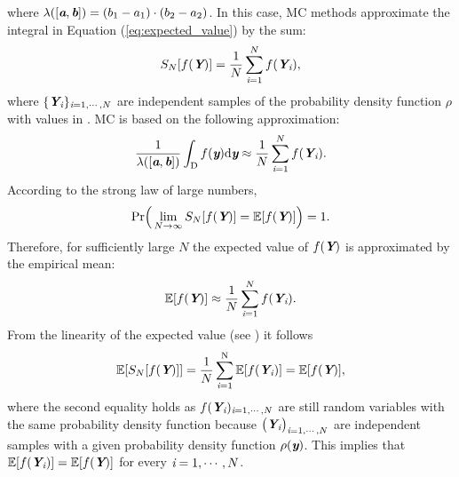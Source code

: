where $\lambda([\textit{\textbf{a}},\textit{\textbf{b}}]) = (b_1-a_1)\cdot(b_2-a_2)$.
In this case, MC methods approximate the integral in Equation (\ref{eq:expected_value}) by the sum:
\begin{equation}
S_{N}[f(\textit{\textbf{Y}})] = \frac{1}{N} \sum_{\textit{i}=1}^{N} f(\textit{\textbf{Y}}_{\textit{i}}),
\end{equation}
where $\{\textit{\textbf{Y}}_{\textit{i}}\}_{\textit{i} = 1, \cdots, N}$ are independent samples of the probability density function $\rho$ with values in  \cite{owen2003quasi}. MC is based on the following approximation:
\begin{equation}\label{eq:approx_MC_QMC}
\frac{1}{\lambda([\textit{\textbf{a}},\textit{\textbf{b}}])}\int_{\textup{D}}f(\textit{\textbf{y}}) \textrm{d}\textit{\textbf{y}}\approx\frac{1}{N} \sum_{\textit{i}=1}^{N} f(\textit{\textbf{Y}}_{\textit{i}}).
\end{equation}
According to the strong law of large numbers,
\begin{equation}
\textrm{Pr}\Big(\lim_{N\rightarrow\infty}S_{N}[f(\textit{\textbf{Y}})] = \mathbb{E}[f(\textit{\textbf{Y}})] \Big) = 1.
\end{equation}
Therefore, for sufficiently large $N$ the expected value of $f(\textit{\textbf{Y}})$ is approximated by the empirical mean:
\begin{equation}
\mathbb{E}[f(\textit{\textbf{Y}})] \approx \frac{1}{N} \sum_{\textit{i}=1}^{N} f(\textit{\textbf{Y}}_{\textit{i}}).
\end{equation}
From the linearity of the expected value (see \cite{grinstead2012introduction})
 it follows
\begin{equation}\label{eq:linearity}
\mathbb{E}[S_{N}[f(\textit{\textbf{Y}})]] = \frac{1}{N}\sum_{\textit{i}=1}^{\textrm{N}}\mathbb{E}[f(\textit{\textbf{Y}}_{\textit{i}})] = \mathbb{E}[f(\textit{\textbf{Y}})],
\end{equation}
where the second equality holds as
$f(\textit{\textbf{Y}}_{\textit{i}})_{\textit{i}=1, \cdots, N}$ are still random variables with the same probability density function because $\big(\textit{\textbf{Y}}_{\textit{i}}\big)_{\textit{i}=1, \cdots, N}$ are independent samples 
with a given probability density function $\rho(\textit{\textbf{y}})$. This implies that $\mathbb{E}[f(\textit{\textbf{Y}}_{\textit{i}})] = \mathbb{E}[f(\textit{\textbf{Y}})]$ for every $\textit{i}=1, \cdots, N$. \\ \indent
